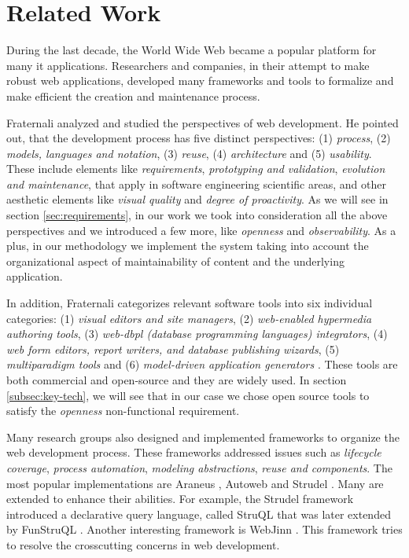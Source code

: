 \documentclass{elsart}
\begin{document}
\section{Related Work}
\label{sec:related}

During the last decade, the World Wide Web became a popular platform for many {\sc it} applications.
Researchers and companies, in their attempt to make robust web applications,
developed many frameworks and tools to formalize and make efficient the creation and maintenance process.

Fraternali \cite{FRA99} analyzed and studied the perspectives of
web development. He pointed out, that the development process has
five distinct perspectives: (1) {\em process}, (2) {\em models, languages and notation}, (3) {\em reuse}, (4) {\em architecture} and (5) {\em usability}.
These include elements like {\em requirements}, {\em  prototyping and validation}, {\em evolution and maintenance}, that apply in
software engineering scientific areas, and other aesthetic elements like {\em visual quality} and {\em degree of proactivity}.
As we will see in section \ref{sec:requirements}, in our work we took into consideration all the above perspectives and we introduced a few more, like {\em openness}
and {\em observability}.
As a plus, in our methodology we implement the system taking into account the organizational aspect of maintainability of content and the underlying application.

In addition, Fraternali categorizes relevant software tools into six individual categories: (1) {\em visual editors and site managers},
 (2) {\em web-enabled hypermedia authoring tools}, (3) {\em web-{\sc dbpl} (database programming languages) integrators}, (4) {\em web form editors, report writers,
 and database publishing wizards},
 (5) {\em multiparadigm tools} and (6) {\em model-driven application generators} \cite{FRA99}. These tools are both commercial and open-source and they are widely used.
 In section \ref{subsec:key-tech}, we will see that in our case we chose open source tools to satisfy the {\em openness} non-functional requirement.
 
Many research groups also designed and implemented frameworks to organize the web development process. These frameworks addressed issues
such as {\em lifecycle coverage}, {\em process automation}, {\em modeling abstractions}, {\em reuse and components}. The most popular implementations are 
Araneus \cite{MAM03}, 
Autoweb \cite{FP00} and Strudel \cite{FFLS00}. Many are extended to enhance their abilities. For example, the Strudel
framework introduced a declarative query language, called StruQL that was later extended by FunStruQL \cite{FST99}. Another interesting
framework is WebJinn \cite{KL03}. This framework tries to resolve the crosscutting concerns in web development.
\end{document}
